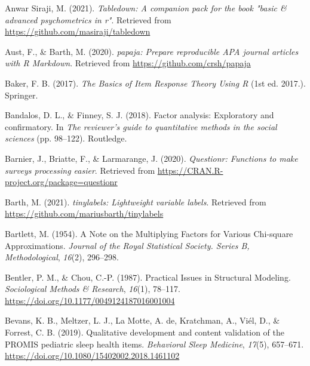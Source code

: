 \documentclass[
  english,
  man]{apa6}
\newlength{\cslhangindent}
\newlength{\cslentryspacingunit} %
\newenvironment{CSLReferences}[2] %
 {%
  \setlength{\parindent}{0pt}
  \ifodd #1
  \let\oldpar\par
  \def\par{\hangindent=\cslhangindent\oldpar}
  \fi
  \setlength{\parskip}{#2\cslentryspacingunit}
 }%
 {}
\begin{document}
\begingroup
\setlength{\parindent}{-0.5in}
\setlength{\leftskip}{0.5in}

\hypertarget{refs}{}
\begin{CSLReferences}{1}{0}
\leavevmode{}%
Anwar Siraji, M. (2021). \emph{Tabledown: A companion pack for the book "basic \& advanced psychometrics in r"}. Retrieved from \url{https://github.com/masiraji/tabledown}

\leavevmode{}%
Aust, F., \& Barth, M. (2020). \emph{{papaja}: {Prepare} reproducible {APA} journal articles with {R Markdown}}. Retrieved from \url{https://github.com/crsh/papaja}

\leavevmode{}%
Baker, F. B. (2017). \emph{The {Basics} of {Item Response Theory Using R}} (1st ed. 2017.). {Springer}.

\leavevmode{}%
Bandalos, D. L., \& Finney, S. J. (2018). Factor analysis: {Exploratory} and confirmatory. In \emph{The reviewer's guide to quantitative methods in the social sciences} (pp. 98--122). {Routledge}.

\leavevmode{}%
Barnier, J., Briatte, F., \& Larmarange, J. (2020). \emph{Questionr: Functions to make surveys processing easier}. Retrieved from \url{https://CRAN.R-project.org/package=questionr}

\leavevmode{}%
Barth, M. (2021). \emph{{tinylabels}: Lightweight variable labels}. Retrieved from \url{https://github.com/mariusbarth/tinylabels}

\leavevmode{}%
Bartlett, M. (1954). A {Note} on the {Multiplying Factors} for {Various Chi}-square {Approximations}. \emph{Journal of the Royal Statistical Society. Series B, Methodological}, \emph{16}(2), 296--298.

\leavevmode{}%
Bentler, P. M., \& Chou, C.-P. (1987). Practical {Issues} in {Structural Modeling}. \emph{Sociological Methods \& Research}, \emph{16}(1), 78--117. \url{https://doi.org/10.1177/0049124187016001004}

\leavevmode{}%
Bevans, K. B., Meltzer, L. J., La Motte, A. de, Kratchman, A., Viél, D., \& Forrest, C. B. (2019). Qualitative development and content validation of the PROMIS pediatric sleep health items. \emph{Behavioral Sleep Medicine}, \emph{17}(5), 657--671. \url{https://doi.org/10.1080/15402002.2018.1461102}


\end{CSLReferences}
\end{document}
